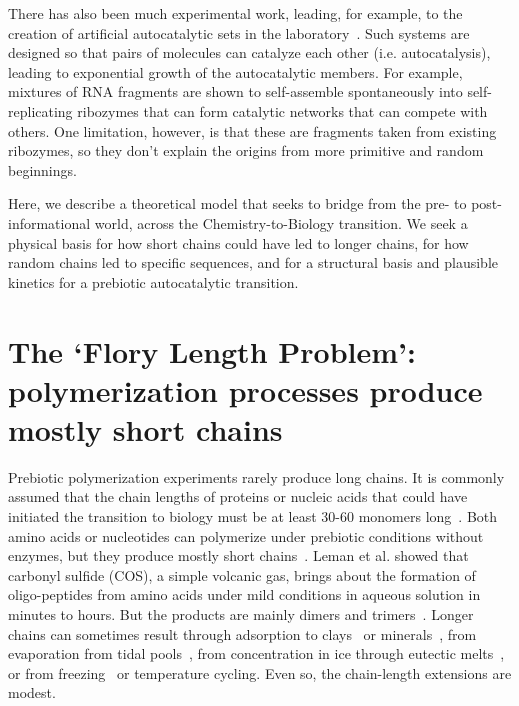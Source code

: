 \documentclass[journal=jacsat,manuscript=article,layout=twocolumn]{achemso}
\begin{document}
 There has also been much experimental work, leading, for example, to the creation of artificial 
autocatalytic sets in the laboratory~\cite{VonKiedrowski1986,Lincoln2009,Vaidya2012}. Such systems 
are designed so that pairs of molecules can catalyze each other (i.e. autocatalysis), leading to 
exponential growth of the autocatalytic members.  For example, mixtures of RNA fragments are shown 
to self-assemble spontaneously into self-replicating ribozymes that can form catalytic networks 
that can compete with others\cite{Robertson2014}.  One limitation, however, is that these are 
fragments 
taken from existing ribozymes, so they don't explain the origins from more primitive and random 
beginnings.
 
  Here, we describe a theoretical model that seeks to bridge from the pre- to post-informational 
world, across the Chemistry-to-Biology transition.  We seek a physical basis for how short chains 
could have led to longer chains, for how random chains led to specific sequences, and for a 
structural basis and plausible kinetics for a prebiotic autocatalytic transition.
   
 \section{The `Flory Length Problem': polymerization processes produce mostly short chains}
 \label{sec:flory} 

Prebiotic polymerization experiments rarely produce long chains.  It is commonly assumed that the 
chain lengths of proteins or nucleic acids that could have initiated the transition to biology must 
be at least 30-60 monomers long~\cite{Szostak1993}.  
Both amino acids or nucleotides can polymerize under prebiotic conditions without enzymes, but 
they 
produce mostly short chains~\cite{Shock1992,Martin1998,PAECHT-HOROWITZ1970,Leman2004a,Orgel2004}.  
Leman et al. showed that carbonyl sulfide (COS), a simple volcanic gas, brings about the formation 
of oligo-peptides from amino acids under mild conditions in aqueous solution in minutes to hours. 
But the products are mainly dimers and trimers~\cite{Leman2004a}.  Longer chains can sometimes 
result through adsorption to clays~\cite{Rao1980,Lambert2008} or 
minerals~\cite{Bernal1949,Ferris1996}, from evaporation from tidal pools~\cite{Nelson2001}, from 
concentration in ice through eutectic melts~\cite{Kanavarioti2001}, or from 
freezing~\cite{Bada2004} or temperature cycling.  Even so, the chain-length extensions are modest. 
 
\end{document}
